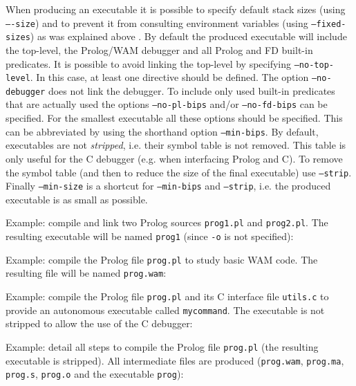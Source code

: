 When producing an executable it is possible to specify default stack sizes
(using \texttt{---size}) and to prevent it from consulting
environment variables (using \texttt{--fixed-sizes}) as was explained above
. By default the produced
executable will include the top-level, the Prolog/WAM debugger
and all Prolog and FD built-in predicates. It is possible to avoid linking
the top-level  by specifying
\texttt{--no-top-level}. In this case, at least one
 directive  should be
defined. The option \texttt{--no-debugger} does not link the debugger. To
include only used built-in predicates that are actually used the options
\texttt{--no-pl-bips} and/or \texttt{--no-fd-bips} can be specified. For the
smallest executable all these options should be specified. This can be
abbreviated by using the shorthand option \texttt{--min-bips}. By default,
executables are not \emph{stripped}, i.e. their symbol table is not
removed. This table is only useful for the C debugger (e.g. when interfacing
Prolog and C). To remove the symbol table (and then to reduce the size of
the final executable) use \texttt{--strip}. Finally \texttt{--min-size} is a
shortcut for \texttt{--min-bips} and \texttt{--strip}, i.e. the produced
executable is as small as possible.

Example: compile and link two Prolog sources \texttt{prog1.pl} and
\texttt{prog2.pl}. The resulting executable will be named \texttt{prog1}
(since \texttt{-o} is not specified):


Example: compile the Prolog file \texttt{prog.pl} to study basic WAM code.
The resulting file will be named \texttt{prog.wam}:


Example: compile the Prolog file \texttt{prog.pl} and its C interface file
\texttt{utils.c} to provide an autonomous executable called
\texttt{mycommand}. The executable is not stripped to allow the use of the C
debugger:


Example: detail all steps to compile the Prolog file \texttt{prog.pl} (the
resulting executable is stripped). All intermediate files are produced
(\texttt{prog.wam}, \texttt{prog.ma}, \texttt{prog.s}, \texttt{prog.o} and
the executable \texttt{prog}):

